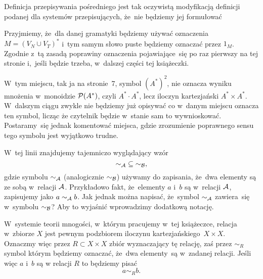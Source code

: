 \documentclass[a4paper,11pt]{article}
\begin{document}
Definicja przepisywania pośredniego jest tak oczywistą modyfikacją
definicji podanej dla systemów przepisujących, że~nie będziemy jej
formułować

\vspace{\spaceFour}





\start {} Przyjmiemy, że~dla danej gramatyki będziemy używać
oznaczenia $M = ( V_{ N } \cup V_{ T } )^{ * }$ i~tym samym słowo puste będziemy
oznaczać przez $1_{ M }$. Zgodnie z~tą zasadą poprawiny oznaczenia
pojawiające~się po raz pierwszy na tej stronie i,~jeśli będzie trzeba,
w~dalszej części tej książeczki.

\vspace{\spaceFour}





\start {} W~tym miejscu, tak ja na stronie~7, symbol
$( A^{ * } )^{ 2 }$, nie oznacza wyniku mnożenia w~monoidzie
$\mathcal{P}( A^{ * } )$, czyli $A^{ * } \cdot A^{ * }$, lecz iloczyn kartezjański
$A^{ * } \times A^{ * }$. W~dalszym ciągu zwykle nie będziemy już opisywać co
w~danym miejscu oznacza ten symbol, licząc że czytelnik będzie w~stanie sam
to wywnioskować. Postaramy~się jednak komentować miejsca, gdzie zrozumienie
poprawnego sensu tego symbolu jest wyjątkowo trudne.

\vspace{\spaceFour}





\start {} W~tej linii znajdujemy tajemniczo wyglądający wzór
\begin{equation}
  \label{eq:Forys-Forys-82}
  \sim_{ \mathcal{A} } \; \subseteq \; \sim_{ \mathcal{B} },
\end{equation}
gdzie symbolu $\sim_{ \mathcal{A} }$ (analogicznie $\sim_{ \mathcal{B} }$) używamy do zapisania,
że~dwa elementy są ze sobą w~relacji $\mathcal{A}$. Przykładowo fakt, że~elementy
$a$ i~$b$ są w~relacji $\mathcal{A}$, zapisujemy jako $a \sim_{ \mathcal{A} } b$. Jak
jednak można napisać, że~symbol $\sim_{ \mathcal{A} }$ zawiera~się w~symbolu
$\sim_{ \mathcal{B} }$? Aby to wyjaśnić wprowadzimy dodatkową notację.

W~systemie teorii mnogości, w~którym pracujemy w~tej książeczce, relacja
w~zbiorze $X$ jest pewnym podzbiorem iloczynu kartezjańskiego~$X \times X$.
Oznaczmy więc przez $R \subset X \times X$ zbiór wyznaczający tę relację, zaś przez
$\sim_{ R }$ symbol którym będziemy oznaczać, że~dwa elementy~są w~zadanej
relacji. Jeśli więc $a$ i~$b$ są w relacji $R$ to będziemy pisać
\begin{equation}
  \label{eq:Forys-Forys-83}
  a \sim_{ R } b.
\end{equation}
\end{document}
